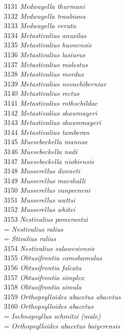 \documentclass[
]{article}
\begin{document}
3131 \emph{Medwayella thurmani}\\
3132 \emph{Medwayella traubiana}\\
3133 \emph{Medwayella veruta}\\
3134 \emph{Metastivalius anaxilas}\\
3135 \emph{Metastivalius huonensis}\\
3136 \emph{Metastivalius lasiurus}\\
3137 \emph{Metastivalius molestus}\\
3138 \emph{Metastivalius mordax}\\
3139 \emph{Metastivalius novaehiberniae}\\
3140 \emph{Metastivalius rectus}\\
3141 \emph{Metastivalius rothschildae}\\
3142 \emph{Metastivalius shawmayeri}\\
3143 \emph{Metastivalius shawnmayeri}\\
3144 \emph{Metastivalius tamberan}\\
3145 \emph{Muesebeckella mannae}\\
3146 \emph{Muesebeckella nadi}\\
3147 \emph{Muesebeckella niobiensis}\\
3148 \emph{Musserellus dunneti}\\
3149 \emph{Musserellus marshalli}\\
3150 \emph{Musserellus vanpeeneni}\\
3151 \emph{Musserellus wattsi}\\
3152 \emph{Musserellus whitei}\\
3153 \emph{Nestivalius pomerantzi}\\
= \emph{Nestivalius ralius}\\
= \emph{Stivalius ralius}\\
3154 \emph{Nestivalius sulawesiensis}\\
3155 \emph{Obtusifrontia comohamulus}\\
3156 \emph{Obtusifrontia falcata}\\
3157 \emph{Obtusifrontia simplex}\\
3158 \emph{Obtusifrontia simula}\\
3159 \emph{Orthopsylloides abacetus abacetus}\\
3160 \emph{Orthopsylloides abacetus}\\
= \emph{Ischnopsyllus schmitzi (male)}\\
= \emph{Orthopsylloides abacetus baiyerensis}\\
\end{document}
